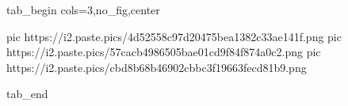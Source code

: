  
 
 
 
 


\ifcmt
  tab_begin cols=3,no_fig,center

     pic https://i2.paste.pics/4d52558c97d20475bea1382c33ae141f.png
		 pic https://i2.paste.pics/57cacb4986505bae01cd9f84f874a0c2.png
		 pic https://i2.paste.pics/cbd8b68b46902cbbc3f19663fecd81b9.png

  tab_end
\fi
